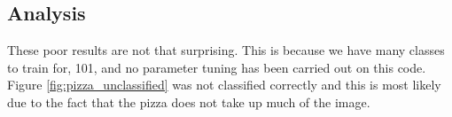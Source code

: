 \tocless\subsection{Analysis}
These poor results are not that surprising.
This is because we have many classes to train for, 101, and no parameter tuning has been carried out on this code.
Figure \ref{fig:pizza_unclassified} was not classified correctly and this is most likely due to the fact that the pizza does not take up much of the image.

\afterpage{\clearpage}